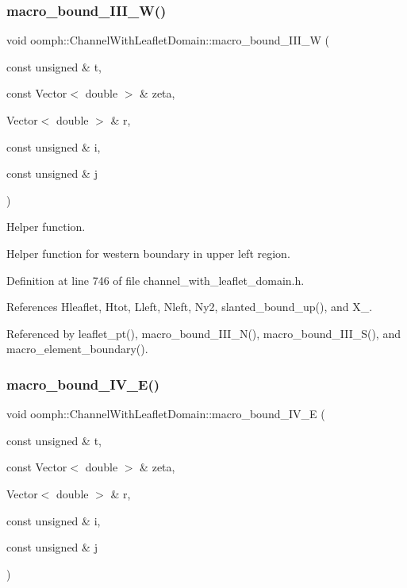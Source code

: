 \subsubsection{\texorpdfstring{macro\+\_\+bound\+\_\+\+I\+I\+I\+\_\+\+W()}{macro\_bound\_III\_W()}}
{\footnotesize\ttfamily void oomph\+::\+Channel\+With\+Leaflet\+Domain\+::macro\+\_\+bound\+\_\+\+I\+I\+I\+\_\+W (\begin{DoxyParamCaption}\item[{const unsigned \&}]{t,  }\item[{const Vector$<$ double $>$ \&}]{zeta,  }\item[{Vector$<$ double $>$ \&}]{r,  }\item[{const unsigned \&}]{i,  }\item[{const unsigned \&}]{j }\end{DoxyParamCaption})\hspace{0.3cm}{\ttfamily [protected]}}



Helper function. 

Helper function for western boundary in upper left region. 

Definition at line 746 of file channel\+\_\+with\+\_\+leaflet\+\_\+domain.\+h.



References Hleaflet, Htot, Lleft, Nleft, Ny2, slanted\+\_\+bound\+\_\+up(), and X\+\_.



Referenced by leaflet\+\_\+pt(), macro\+\_\+bound\+\_\+\+I\+I\+I\+\_\+\+N(), macro\+\_\+bound\+\_\+\+I\+I\+I\+\_\+\+S(), and macro\+\_\+element\+\_\+boundary().

\mbox{\label{classoomph_1_1ChannelWithLeafletDomain_a16c8d718f5da2e6d9d73fe0455bacc0c}} 
\subsubsection{\texorpdfstring{macro\+\_\+bound\+\_\+\+I\+V\+\_\+\+E()}{macro\_bound\_IV\_E()}}
{\footnotesize\ttfamily void oomph\+::\+Channel\+With\+Leaflet\+Domain\+::macro\+\_\+bound\+\_\+\+I\+V\+\_\+E (\begin{DoxyParamCaption}\item[{const unsigned \&}]{t,  }\item[{const Vector$<$ double $>$ \&}]{zeta,  }\item[{Vector$<$ double $>$ \&}]{r,  }\item[{const unsigned \&}]{i,  }\item[{const unsigned \&}]{j }\end{DoxyParamCaption})\hspace{0.3cm}{\ttfamily [protected]}}



